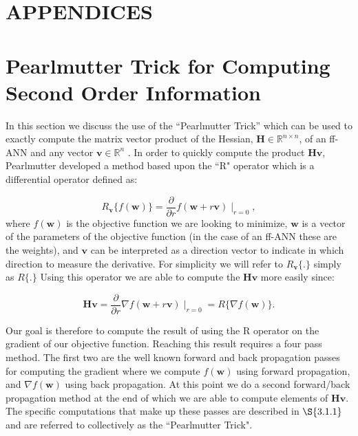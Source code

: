 \documentclass[letterpaper,12pt,titlepage,oneside,final]{book}
\begin{document}
	\appendix
	
	\chapter*{APPENDICES}
	\chapter{Pearlmutter Trick for Computing Second Order Information}
	\label{appendix:pearlmutter}
	
	In this section we discuss the use of the ``Pearlmutter Trick'' which can be used to exactly compute the matrix vector product of the Hessian, $\mathbf{H} \in \mathbb{R}^{n\times n}$, of an ff-ANN and any vector $\mathbf{v} \in \mathbb{R}^{n}$ \cite{Pearlmutter.1993}. In order to quickly compute the product $\mathbf{Hv}$, Pearlmutter developed a method based upon the ``R" operator which is a differential operator \cite{Pearlmutter.1993} defined as:
	
	\begin{equation}
	R_{\mathbf{v}}\{f(\mathbf{w})\} = \frac{\partial}{\partial r}f(\mathbf{w} + r\mathbf{v})\mid_{r=0} ,
	\end{equation}
	where $f(\mathbf{w})$ is the objective function we are looking to minimize, $\mathbf{w}$ is a vector of the parameters of the objective function (in the case of an ff-ANN these are the weights), and $\mathbf{v}$ can be interpreted as a direction vector to indicate in which direction to measure the derivative. For simplicity we will refer to $R_{\mathbf{v}}\{.\}$ simply as $R\{.\}$ Using this operator we are able to compute the $\mathbf{Hv}$ more easily since:
	
	\begin{equation}
	\mathbf{Hv} = \frac{\partial}{\partial r}\nabla{f}(\mathbf{w} + r\mathbf{v})\mid_{r=0} = R\{\nabla{f(\mathbf{w})}\}.
	\end{equation}
	
	Our goal is therefore to compute the result of using the R operator on the gradient of our objective function. Reaching this result requires a four pass method. The first two are the well known forward and back propagation passes for computing the gradient where we compute $f(\mathbf{w})$ using forward propagation, and $\nabla{f(\mathbf{w})}$ using back propagation. At this point we do a second forward/back propagation method at the end of which we are able to compute elements of $\mathbf{Hv}$.  The specific computations that make up these passes are described in $\S{3.1.1}$ and are referred to collectively as the ``Pearlmutter Trick".  
	
\end{document}
